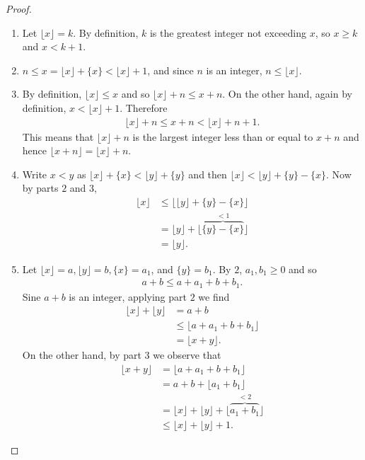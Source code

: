 \documentclass[12pt]{subfile}
\begin{document}
        \begin{proof}
        	\begin{enumerate}[1.]
        		\item Let $\lfloor x \rfloor=k$. By definition, $k$ is the greatest integer not exceeding $x$, so $x \geq k$ and $x<k+1$.
        		\item $n \leq x = \lfloor x \rfloor + \{x\} <\lfloor x \rfloor +1$, and since $n$ is an integer, $n \leq \lfloor x \rfloor$.
        		\item By definition, $\lfloor x \rfloor \leq x$ and so $\lfloor x \rfloor+n \leq x+n$. On the other hand, again by definition, $x < \lfloor x \rfloor+1$. Therefore
        		\begin{align*}
        		\lfloor x \rfloor +n \leq x+n < \lfloor x \rfloor + n+ 1.
        		\end{align*}
        		This means that $\lfloor x \rfloor +n$ is the largest integer less than or equal to $x+n$ and hence $\lfloor x+n\rfloor=\lfloor x\rfloor+n$.
        		\item Write $x<y$ as $\lfloor x \rfloor + \{x\} < \lfloor y \rfloor + \{y\}$ and then $\lfloor x \rfloor < \lfloor y \rfloor +\{y\}-\{x\}$. Now by parts $2$ and $3$,
        		\begin{align*}
        		\lfloor x \rfloor &\leq \bigg\lfloor\lfloor y \rfloor +\{y\}-\{x\}\bigg\rfloor\\
        		&= \lfloor y \rfloor + \bigg\lfloor\overbrace{\{y\}-\{x\}}^{<1}\bigg\rfloor\\
        		&= \lfloor y \rfloor.
        		\end{align*}
        		\item Let $	\lfloor x \rfloor=a, \lfloor y \rfloor=b, \{x\}=a_1$, and $\{y\}=b_1$. By $2$, $a_1, b_1 \geq 0$ and so
        		\begin{align*}
        		a+b \leq a+a_1+b+b_1.
        		\end{align*}
        		Sine $a+b$ is an integer, applying part $2$ we find
        		\begin{align*}
        		\lfloor x \rfloor + \lfloor y \rfloor &= a+b \\
        		&\leq \lfloor a+a_1+b+b_1 \rfloor\\
        		&= \lfloor x+y \rfloor.
        		\end{align*}
        		On the other hand, by part $3$ we observe that
        		\begin{align*}
        		\lfloor x+y \rfloor &= \lfloor a+a_1+b+b_1 \rfloor\\
        		&= a + b + \lfloor a_1+b_1 \rfloor\\
        		&= \lfloor x \rfloor + \lfloor y \rfloor + \lfloor \overbrace{a_1+b_1}^{<2} \rfloor\\
        		&\leq \lfloor x \rfloor + \lfloor y \rfloor + 1.
        		\end{align*}
        		

\end{enumerate}
\end{proof}
\end{document}
